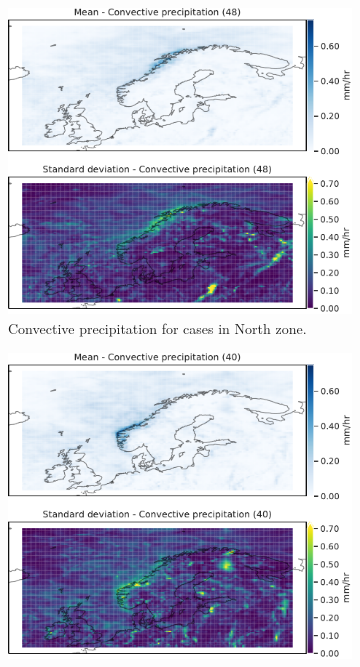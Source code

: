 \begin{figure}
\begin{subfigure}[b]{0.49\textwidth}
    \centering
    \includegraphics[width=\textwidth]{Figures/cPNord.pdf}
    \caption{Convective precipitation for cases in North zone.}
    \label{fig:NordcP}
\end{subfigure}
\begin{subfigure}[b]{0.49\textwidth}
    \centering
    \includegraphics[width=\textwidth]{Figures/cPNordvest.pdf}

\end{subfigure}
\end{figure}
